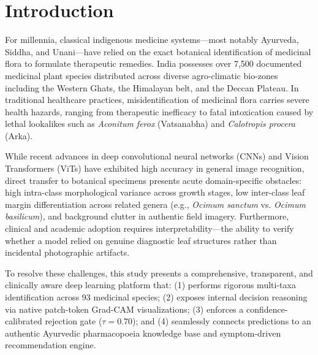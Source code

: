 \documentclass[sn-mathphys,Numbered]{sn-jnl}%
\begin{document}

\maketitle

\section{Introduction}\label{sec1}
For millennia, classical indigenous medicine systems---most notably Ayurveda, Siddha, and Unani---have relied on the exact botanical identification of medicinal flora to formulate therapeutic remedies. India possesses over 7,500 documented medicinal plant species distributed across diverse agro-climatic bio-zones including the Western Ghats, the Himalayan belt, and the Deccan Plateau. In traditional healthcare practices, misidentification of medicinal flora carries severe health hazards, ranging from therapeutic inefficacy to fatal intoxication caused by lethal lookalikes such as \textit{Aconitum ferox} (Vatsanabha) and \textit{Calotropis procera} (Arka).

While recent advances in deep convolutional neural networks (CNNs) and Vision Transformers (ViTs) have exhibited high accuracy in general image recognition, direct transfer to botanical specimens presents acute domain-specific obstacles: high intra-class morphological variance across growth stages, low inter-class leaf margin differentiation across related genera (e.g., \textit{Ocimum sanctum} vs. \textit{Ocimum basilicum}), and background clutter in authentic field imagery. Furthermore, clinical and academic adoption requires interpretability---the ability to verify whether a model relied on genuine diagnostic leaf structures rather than incidental photographic artifacts.

To resolve these challenges, this study presents a comprehensive, transparent, and clinically aware deep learning platform that: (1) performs rigorous multi-taxa identification across 93 medicinal species; (2) exposes internal decision reasoning via native patch-token Grad-CAM visualizations; (3) enforces a confidence-calibrated rejection gate ($\tau = 0.70$); and (4) seamlessly connects predictions to an authentic Ayurvedic pharmacopoeia knowledge base and symptom-driven recommendation engine.
\end{document}
